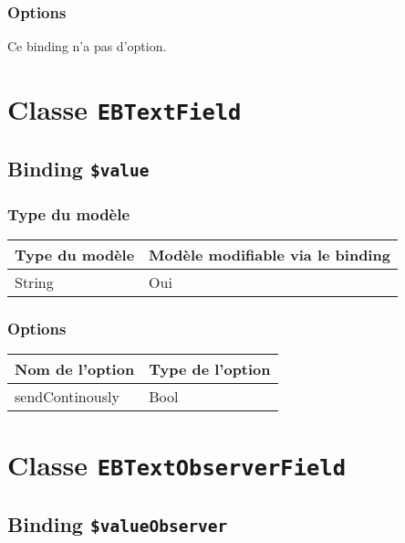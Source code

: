 \subsubsection{Options}

Ce binding n'a pas d'option.








\section{Classe \texttt{EBTextField}}

\subsection{Binding \texttt{\$value}}

\subsubsection{Type du modèle}

\begin{tabular}{|l|l|}
\hline
\textbf{Type du modèle} & \textbf{Modèle modifiable via le binding}\\
\hline
String & Oui\\
\hline
\end{tabular}
\subsubsection{Options}

\begin{tabular}{|l|l|}
\hline
\textbf{Nom de l'option} & \textbf{Type de l'option}\\
\hline
sendContinously & Bool\\
\hline
\end{tabular}







\section{Classe \texttt{EBTextObserverField}}

\subsection{Binding \texttt{\$valueObserver}}

